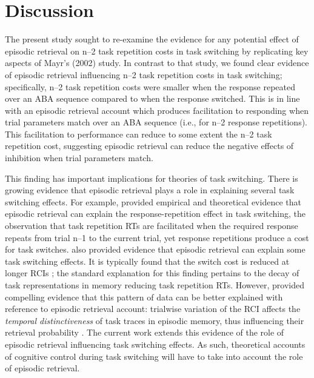 \documentclass[a4paper, doc, natbib]{apa6}
\begin{document}
\section{Discussion}

The present study sought to re-examine the evidence for any potential effect of episodic retrieval on n--2 task repetition costs in task switching by replicating key aspects of Mayr's (2002) study. In contrast to that study, we found clear evidence of episodic retrieval influencing n--2 task repetition costs in task switching; specifically, n--2 task repetition costs were smaller when the response repeated over an ABA sequence compared to when the response switched. This is in line with an episodic retrieval account which produces facilitation to responding when trial parameters match over an ABA sequence (i.e., for n--2 response repetitions). This facilitation to performance can reduce to some extent the n--2 task repetition cost, suggesting episodic retrieval can reduce the negative effects of inhibition when trial parameters match.

This finding has important implications for theories of task switching. There is growing evidence that episodic retrieval plays a role in explaining several task switching effects. For example, \cite{Altmann2011} provided empirical and theoretical evidence that episodic retrieval can explain the response-repetition effect in task switching, the observation that task repetition RTs are facilitated when the required response repeats from trial n--1 to the current trial, yet response repetitions produce a cost for task switches. \cite{Horoufchin2011a} \citep[see also][]{Horoufchin2011} also provided evidence that episodic retrieval can explain some task switching effects. It is typically found that the switch cost is reduced at longer RCIs \cite[e.g.,][]{Meiran2000a}; the standard explanation for this finding pertains to the decay of task representations in memory reducing task repetition RTs. However, \cite{Horoufchin2011a} provided compelling evidence that this pattern of data can be better explained with reference to episodic retrieval account: trialwise variation of the RCI affects the \emph{temporal distinctiveness} of task traces in episodic memory, thus influencing their retrieval probability \citep{Brown2007,Grange2015}. The current work extends this evidence of the role of episodic retrieval influencing task switching effects. As such, theoretical accounts of cognitive control during task switching will have to take into account the role of episodic retrieval. 
\end{document}
